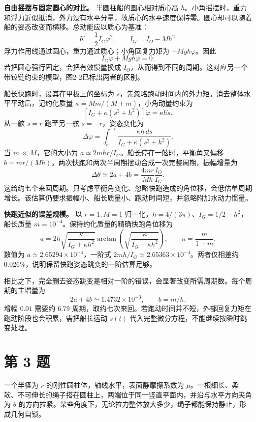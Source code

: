 \documentclass[12pt,a4paper,UTF8]{ctexart}
\begin{document}
\textbf{自由摇摆与固定圆心的对比。} 半圆柱船的圆心相对质心高
\(h\)。小角摇摆时，重力和浮力近似抵消，外力没有水平分量，故质心的水平速度保持零。圆心却可以随着船的姿态改变而横移。总动能应以质心为基准：
\[
K=\frac12I_G\dot\varphi^2,\qquad I_G=I_O-Mh^2.
\] 浮力作用线通过圆心，重力通过质心；小角回复力矩为
\(-Mgh\varphi\)。因此 \[
I_G\ddot\varphi+Mgh\varphi=0.
\] 若把圆心强行固定，会把有效惯量换成
\(I_O\)，从而得到不同的周期。这对应另一个带铰链约束的模型，图2-2已标出两者的区别。

船长快跑时，设其在甲板上的坐标为
\(s\)，先忽略跑动时间内的外力矩。消去整体水平平动后，记约化质量
\(\kappa=Mm/(M+m)\)，小角动量约束为 \[
[I_G+\kappa(s^2+h^2)]\dot\varphi=\kappa h\dot s.
\] 从一舷 \(s=r\) 跑至另一舷 \(s=-r\)，姿态变化为 \[
\Delta\varphi=\int_r^{-r}\frac{\kappa h\,ds}{I_G+\kappa(s^2+h^2)}.
\] 当 \(m\ll M\)，它的大小为
\(a\simeq2mhr/I_G\)。船长停在一舷时，平衡角又偏移
\(b=mr/(Mh)\)。两次快跑和两次半周期摆动合成一次完整周期，振幅增量为 \[
\Delta\theta\simeq2a+4b=\frac{4mr}{Mh}\frac{I_O}{I_G}.
\]
这给约七个来回周期。只考虑平衡角变化、忽略快跑造成的角位移，会低估单周期增长。该估算仍要求振幅小、船长质量小、跑动时间短，并忽略附加水动力惯量。

\textbf{快跑近似的误差规模。} 以 \(r=1,M=1\)
归一化，\(h=4/(3\pi)\)、\(I_G=1/2-h^2\)，船长质量
\(m=10^{-4}\)。保持约化质量的精确快跑角位移为 \[
a=2h\sqrt{\frac{\kappa}{I_G+\kappa h^2}}
\arctan\left(\sqrt{\frac\kappa{I_G+\kappa h^2}}\right),
\qquad \kappa=\frac{m}{1+m}.
\] 数值为 \(a\simeq2.65294\times10^{-4}\)，一阶式
\(2mh/I_G\simeq2.65363\times10^{-4}\)。两者仅相差约
\(0.026\%\)，说明保留快跑姿态跳变的一阶估算足够。

相比之下，完全删去姿态跳变是相对一阶的错误，会显著改变所需周期数。每个周期的主增量为
\[
2a+4b\simeq1.4732\times10^{-3},
\qquad b=m/h.
\] 增幅 \(0.01\) 需要约 \(6.79\)
周期，取约七次来回。若跑动时间并不短，外部回复力矩在跑动阶段也会积累，需把船长运动
\(s(t)\) 代入完整微分方程，不能继续按瞬时跳变处理。

\newpage

\section{第 3 题}\label{ux7b2c-3-ux9898}

一个半径为 \(r\) 的刚性圆柱体，轴线水平，表面静摩擦系数为
\(\mu\)。一根细长、柔软、不可伸长的绳子搭在圆柱上，两端位于同一竖直平面内，并沿与水平方向夹角为
\(\theta\)
的方向拉紧。某些角度下，无论拉力整体放大多少，绳子都能保持静止，形成几何自锁。
\end{document}
